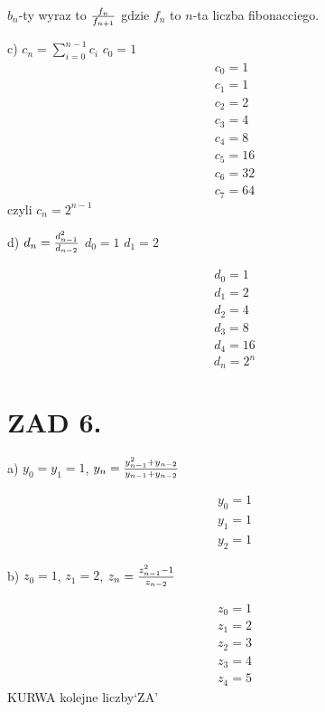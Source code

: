 \documentclass{article}[13pt]
\begin{document}
    $b_n$-ty wyraz to ${f_n\over f_{n+1}}$ gdzie $f_n$ to $n$-ta liczba fibonacciego.
    \medskip

    c) $c_n=\sum\limits_{i=0}^{n-1}c_i$ $c_0=1$
    \begin{align*}
        c_0=1\\
        c_1=1\\
        c_2=2\\
        c_3=4\\
        c_4=8\\
        c_5=16\\
        c_6=32\\
        c_7=64
    \end{align*}
    czyli $c_n=2^{n-1}$
    \medskip

    d) $d_n={d_{n-1}^2\over d_{n-2}}$ $d_0=1$ $d_1=2$

    \begin{align*}
        d_0=1\\
        d_1=2\\
        d_2=4\\
        d_3=8\\
        d_4=16
    \end{align*}
    $$d_n=2^n$$


    \section*{ZAD 6.}

    a) $y_0=y_1=1$, $y_n={y_{n-1}^2+y_{n-2}\over y_{n-1}+y_{n-2}}$
    \medskip

    \begin{align*}
        y_0=1\\
        y_1=1\\
        y_2=1
    \end{align*}

    b) $z_0=1$, $z_1=2$, $z_n={z_{n-1}^2-1\over z_{n-2}}$

    \begin{align*}
        z_0=1\\
        z_1=2\\
        z_2=3\\
        z_3=4\\
        z_4=5
    \end{align*}
    KURWA kolejne liczby`ZA'
\end{document}
